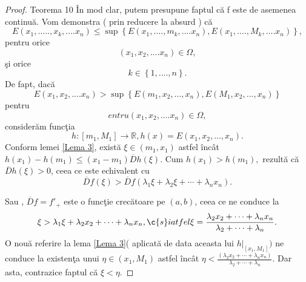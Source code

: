 \documentclass[a4paper,12pt,oneside]{report}
\begin{document}
\begin{proof} Teorema 10
\^{I}n mod clar, putem presupune faptul c\u{a} f este de asemenea continu\u{a}. Vom demonstra ( prin reducere la absurd ) c\u{a}
\begin{displaymath}
  E \left ( x_{1},....., x_{k},....x_{n} \right ) \leq  \sup \left \{ E\left ( x_{1},....,m_{k},....x_{n} \right ),E\left ( x_{1},....,M_{k},....x_{n} \right ) \right \},
\end{displaymath}
 pentru orice
\begin{displaymath}
     \left ( x_{1}, x_{2},....x_{n} \right ) \in\Omega, 
\end{displaymath}
\c{s}i orice
\begin{displaymath}
    k \in\left \{ 1,....,n \right \}. 
\end{displaymath}
 De fapt, dac\u{a}
\begin{displaymath}
   E  \left ( x_{1}, x_{2},....x_{n} \right )  >  \sup \left \{ E\left ( m_{1}, x_{2} ,..., x_{n}\right ), E\left ( M_{1}, x_{2} ,..., x_{n}\right )  \right \}  
\end{displaymath}
pentru
\begin{displaymath}
  entru \left ( x_{1}, x_{2},....x_{n} \right ) \in \Omega,
\end{displaymath}
consider\u{a}m func\c{t}ia 
\begin{displaymath}
  h : \left [ m_{1}, M_{1} \right ] \rightarrow \mathbb{R}, h\left ( x \right ) = E\left ( x_{1}, x_{2},...,x_{n} \right ). 
\end{displaymath}
Conform lemei \ref{Lema 3}, exist\u{a} \(\xi \in \left ( m_{1}, x_{1} \right )\) astfel \^{i}nc\^{a}t \(h \left ( x_{1} \right ) - h\left ( m_{1} \right ) \leq  \left ( x_{1} - m_{1} \right )\overline{D}h\left ( \xi  \right ).\) 
Cum \(h \left ( x_{1} \right ) >  h\left ( m_{1} \right ),\) rezult\u{a} c\u{a} \(\overline{D}h\left ( \xi  \right ) > 0\), ceea ce este echivalent cu 
\begin{displaymath}
   \overline{D}f\left ( \xi  \right ) > \overline{D}f\left (\lambda _{1}\xi +\lambda _{2}\xi +\cdots +\lambda _{n} x_{n} \right ). 
\end{displaymath}

Sau , \(\overline{D}f = {f}'_{+}\) este o func\c{t}ie crec\u{a}toare pe \(\left ( a,b \right )\), ceea ce ne conduce la 
\begin{displaymath}
   \xi > \lambda _{1}\xi +\lambda _{2}x_{2} + \cdots +\lambda _{n}x_{n},
\c{s}i atfel \xi = \frac{\lambda _{2}x_{2} + \cdots +\lambda _{n}x_{n}}{\lambda _{2}+\cdots +\lambda _{n}}.
\end{displaymath}
O nou\u{a} referire la lema \ref{Lema 3}( aplicat\u{a} de data aceasta lui \(h|_{\left [ x_{1},M_{1} \right ]})\) ne conduce la existen\c{t}a unui \(\eta \in \left ( x_{1} , M_{1}\right )\) astfel \^{i}nc\^{a}t \(\eta < \frac{\left ( \lambda _{2}x_{2}+\cdots +\lambda _{n}x_{n} \right )}{\lambda _{2}+\cdots +\lambda _{n}}\). Dar asta, contrazice faptul c\u{a} \(\xi <  \eta \). 
\end{proof}
\end{document}
